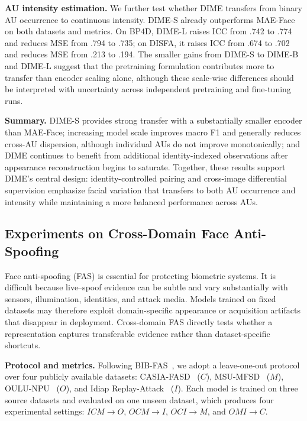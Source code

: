 \documentclass[10pt,journal,compsoc]{IEEEtran}
\begin{document}
\noindent\textbf{AU intensity estimation.} We further test whether DIME transfers from binary AU occurrence to continuous intensity. DIME-S already outperforms MAE-Face on both datasets and metrics. On BP4D, DIME-L raises ICC from .742 to .774 and reduces MSE from .794 to .735; on DISFA, it raises ICC from .674 to .702 and reduces MSE from .213 to .194. The smaller gains from DIME-S to DIME-B and DIME-L suggest that the pretraining formulation contributes more to transfer than encoder scaling alone, although these scale-wise differences should be interpreted with uncertainty across independent pretraining and fine-tuning runs.



\noindent\textbf{Summary.} DIME-S provides strong transfer with a substantially smaller encoder than MAE-Face; increasing model scale improves macro F1 and generally reduces cross-AU dispersion, although individual AUs do not improve monotonically; and DIME continues to benefit from additional identity-indexed observations after appearance reconstruction begins to saturate. Together, these results support DIME's central design: identity-controlled pairing and cross-image differential supervision emphasize facial variation that transfers to both AU occurrence and intensity while maintaining a more balanced performance across AUs.



\subsection{Experiments on Cross-Domain Face Anti-Spoofing}
\label{sec:exp_cross_domain_fas}

Face anti-spoofing (FAS) \cite{yu2025learning} is essential for protecting biometric systems. It is difficult because live--spoof evidence can be subtle and vary substantially with sensors, illumination, identities, and attack media. Models trained on fixed datasets may therefore exploit domain-specific appearance or acquisition artifacts that disappear in deployment. Cross-domain FAS directly tests whether a representation captures
transferable evidence rather than dataset-specific shortcuts.


\noindent\textbf{Protocol and metrics.} Following BIB-FAS~\cite{yu2025learning}, we adopt a leave-one-out protocol over four publicly available datasets: CASIA-FASD~\cite{zhang2012face} ($C$), MSU-MFSD~\cite{wen2015face} ($M$), OULU-NPU~\cite{boulkenafet2017oulu} ($O$), and Idiap Replay-Attack~\cite{chingovska2012effectiveness} ($I$). Each model is trained on three source datasets and evaluated on one unseen dataset, which produces four experimental settings: $ICM\!\rightarrow\!O$, $OCM\!\rightarrow\!I$, $OCI\!\rightarrow\!M$, and $OMI\!\rightarrow\!C$.
\end{document}
